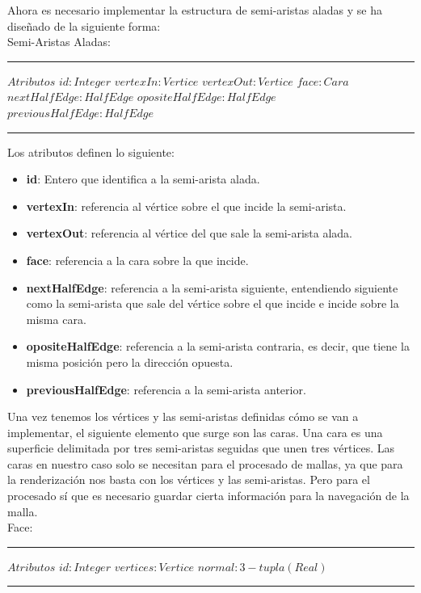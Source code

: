 Ahora es necesario implementar la estructura de semi-aristas aladas y se ha diseñado de la siguiente forma:\\

Semi-Aristas Aladas:
\begin{algorithmic}
	\hrule
	\State $Atributos$
	\State \hspace{1cm} $id : Integer$
	\State \hspace{1cm} $vertexIn : Vertice$
	\State \hspace{1cm} $vertexOut : Vertice$
	\State \hspace{1cm} $face : Cara$
	\State \hspace{1cm} $nextHalfEdge : HalfEdge$
	\State \hspace{1cm} $opositeHalfEdge : HalfEdge$
	\State \hspace{1cm} $previousHalfEdge : HalfEdge$
	\hrule
\end{algorithmic}
\vspace*{1cm}

Los atributos definen lo siguiente:
\begin{itemize}
	\item \textbf{id}: Entero que identifica a la semi-arista alada.
	\item \textbf{vertexIn}: referencia al vértice sobre el que incide la semi-arista.
	\item \textbf{vertexOut}: referencia al vértice del que sale la semi-arista alada.
	\item \textbf{face}: referencia a la cara sobre la que incide.
	\item \textbf{nextHalfEdge}: referencia a la semi-arista siguiente, entendiendo siguiente como la semi-arista que sale del vértice sobre el que incide e incide sobre la misma cara.
	\item \textbf{opositeHalfEdge}: referencia a la semi-arista contraria, es decir, que tiene la misma posición pero la dirección opuesta.
	\item \textbf{previousHalfEdge}: referencia a la semi-arista anterior.
\end{itemize}

Una vez tenemos los vértices y las semi-aristas definidas cómo se van a implementar, el siguiente elemento que surge son las caras. Una cara es una superficie delimitada por tres semi-aristas seguidas que unen tres vértices. Las caras en nuestro caso solo se necesitan para el procesado de mallas, ya que para la renderización nos basta con los vértices y las semi-aristas. Pero para el procesado sí que es necesario guardar cierta información para la navegación de la malla.\\
\newpage
Face:
\begin{algorithmic}
	\hrule
	\State $Atributos$
	\State \hspace{1cm} $id : Integer$
	\State \hspace{1cm} $vertices : Vertice$
	\State \hspace{1cm} $normal : 3-tupla(Real)$
	\hrule
\end{algorithmic}
\vspace*{1cm}

